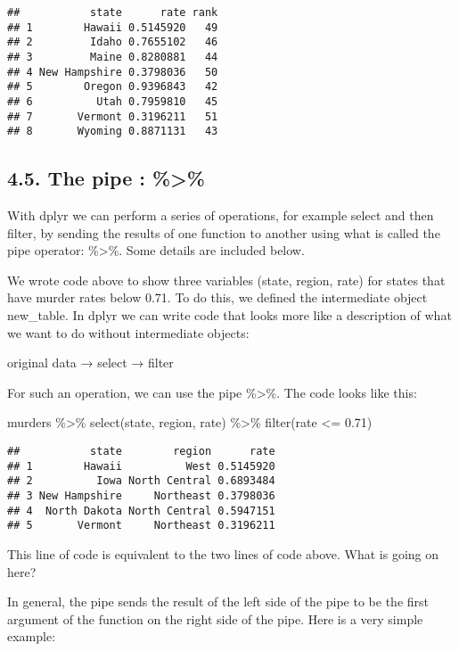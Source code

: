 \documentclass[
]{article}
\newenvironment{Shaded}{\begin{snugshade}}{\end{snugshade}}
\newcommand{\FloatTok}[1]{\textcolor[rgb]{0.00,0.00,0.81}{#1}}
\newcommand{\FunctionTok}[1]{\textcolor[rgb]{0.00,0.00,0.00}{#1}}
\newcommand{\NormalTok}[1]{#1}
\newcommand{\SpecialCharTok}[1]{\textcolor[rgb]{0.00,0.00,0.00}{#1}}
\begin{document}
\begin{verbatim}
##           state      rate rank
## 1        Hawaii 0.5145920   49
## 2         Idaho 0.7655102   46
## 3         Maine 0.8280881   44
## 4 New Hampshire 0.3798036   50
## 5        Oregon 0.9396843   42
## 6          Utah 0.7959810   45
## 7       Vermont 0.3196211   51
## 8       Wyoming 0.8871131   43
\end{verbatim}

\hypertarget{the-pipe}{%
\subsection{4.5. The pipe : \%\textgreater\%}\label{the-pipe}}

With dplyr we can perform a series of operations, for example select and
then filter, by sending the results of one function to another using
what is called the pipe operator: \%\textgreater\%. Some details are
included below.

We wrote code above to show three variables (state, region, rate) for
states that have murder rates below 0.71. To do this, we defined the
intermediate object new\_table. In dplyr we can write code that looks
more like a description of what we want to do without intermediate
objects:

original data → select → filter

For such an operation, we can use the pipe \%\textgreater\%. The code
looks like this:

\begin{Shaded}
\begin{Highlighting}[]
\NormalTok{murders }\SpecialCharTok{\%\textgreater{}\%} \FunctionTok{select}\NormalTok{(state, region, rate) }\SpecialCharTok{\%\textgreater{}\%} \FunctionTok{filter}\NormalTok{(rate }\SpecialCharTok{\textless{}=} \FloatTok{0.71}\NormalTok{)}
\end{Highlighting}
\end{Shaded}

\begin{verbatim}
##           state        region      rate
## 1        Hawaii          West 0.5145920
## 2          Iowa North Central 0.6893484
## 3 New Hampshire     Northeast 0.3798036
## 4  North Dakota North Central 0.5947151
## 5       Vermont     Northeast 0.3196211
\end{verbatim}

This line of code is equivalent to the two lines of code above. What is
going on here?

In general, the pipe sends the result of the left side of the pipe to be
the first argument of the function on the right side of the pipe. Here
is a very simple example:
\end{document}
